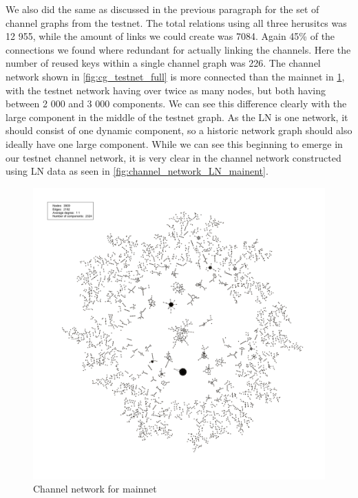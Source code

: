 We also did the same as discussed in the previous paragraph for the set of channel graphs from the testnet. The total relations using all three herusitcs was 12 955, while the amount of links we could create was 7084. Again 45\% of the connections we found where redundant for actually linking the channels. Here the number of reused keys within a single channel graph was 226.
The channel network shown in \cref{fig:cg_testnet_full} is more connected than the mainnet in \cref{fig:cg_mainnet_full}, with the testnet network having over twice as many nodes, but both having between 2 000 and 3 000 components. We can see this difference clearly with the large component in the middle of the testnet graph. As the LN is one network, it should consist of one dynamic component, so a historic network graph should also ideally have one large component. While we can see this beginning to emerge in our testnet channel network, it is very clear in the channel network constructed using LN data as seen in \cref{fig:channel_network_LN_mainent}.
\\

\begin{figure}[ht]
    \centering
    \includegraphics[width=13cm]{figures/graphs/cg_bc_mainnet_full.png}
    \caption{Channel network for mainnet}
    \label{fig:cg_mainnet_full}
\end{figure}


